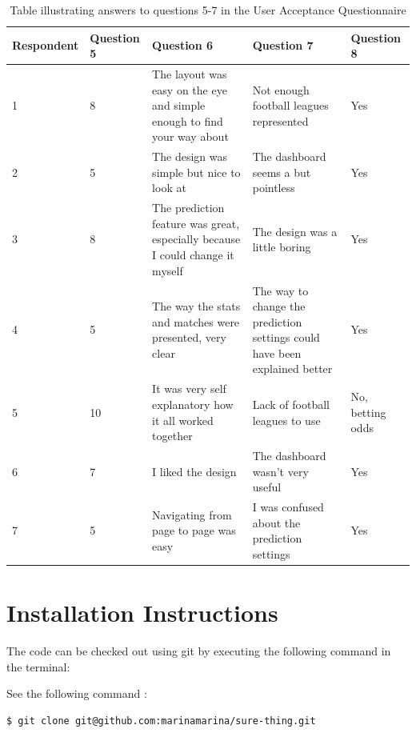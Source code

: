\noindent
\begin{table}
\begin{tabular}{
  |p{}%
  |p{}%
  |p{}%
  |p{}%
  |p{}|%
  }
  \hline
  \centering Respondent  & \centering Question 5  & \centering Question 6 &  \centering Question 7 & \centering\arraybackslash Question 8   \\ \hline
  1  & 8 & The layout was easy on the eye and simple enough to find your way about & Not enough football leagues represented & Yes \\ \hline
  2 & 5 & The design was simple but nice to look at & The dashboard seems a but pointless & Yes \\ \hline
  3 & 8 & The prediction feature was great, especially because I could change it myself & The design was a little boring & Yes \\ \hline
  4 & 5 & The way the stats and matches were presented, very clear & The way to change the prediction settings could have been explained better & Yes \\ \hline
  5 &  10 & It was very self explanatory how it all worked together & Lack of football leagues to use & No, betting odds \\ \hline
  6 &  7 & I liked the design & The dashboard wasn't very useful & Yes \\ \hline
  7 &  5 &  Navigating from page to page was easy & I was confused about the prediction settings & Yes \\ \hline

  \end{tabular}
 \caption{Table illustrating answers to questions 5-7 in the User Acceptance Questionnaire}

\end{table}
 
\chapter{Installation Instructions}
\label{ch:install_appendix}
The code can be checked out using git by executing the following command in the terminal:

\noindent See the following command :
\begin{lstlisting}[language=bash]
  $ git clone git@github.com:marinamarina/sure-thing.git
\end{lstlisting}

